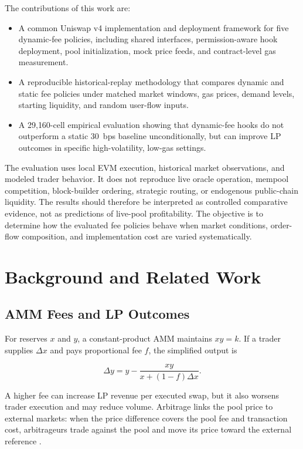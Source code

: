 \documentclass[a4paper,conference]{IEEEtran}
\begin{document}
The contributions of this work are:
\begin{itemize}
  \item A common Uniswap v4 implementation and deployment framework for five dynamic-fee policies, including shared interfaces, permission-aware hook deployment, pool initialization, mock price feeds, and contract-level gas measurement.

  \item A reproducible historical-replay methodology that compares dynamic and static fee policies under matched market windows, gas prices, demand levels, starting liquidity, and random user-flow inputs.
  \item A 29{,}160-cell empirical evaluation showing that dynamic-fee hooks do not outperform a static 30~bps baseline unconditionally, but can improve LP outcomes in specific high-volatility, low-gas settings.
\end{itemize}

The evaluation uses local EVM execution, historical market observations, and modeled trader behavior. It does not reproduce live oracle operation, mempool competition, block-builder ordering, strategic routing, or endogenous public-chain liquidity. The results should therefore be interpreted as controlled comparative evidence, not as predictions of live-pool profitability. The objective is to determine how the evaluated fee policies behave when market conditions, order-flow composition, and implementation cost are varied systematically.

\section{Background and Related Work}
\label{sec:background}

\subsection{AMM Fees and LP Outcomes}

For reserves $x$ and $y$, a constant-product AMM maintains $xy=k$.
If a trader supplies $\Delta x$ and pays proportional fee $f$, the
simplified output is

\begin{equation}
  \Delta y
  =
  y-\frac{xy}{x+(1-f)\Delta x}.
  \label{eq:swap-output}
\end{equation}

A higher fee can increase LP revenue per executed swap, but it also
worsens trader execution and may reduce volume. Arbitrage links the
pool price to external markets: when the price difference covers the
pool fee and transaction cost, arbitrageurs trade against the pool and
move its price toward the external reference
\cite{angeris2019analysis,angeris2020improved,angeris2022multiasset}.
\end{document}
